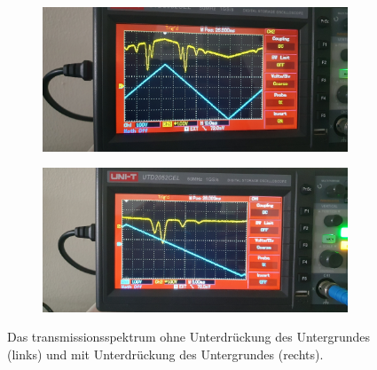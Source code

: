 \begin{figure}
    \centering
    \begin{subfigure}[b]{0.49\textwidth}
        \centering
        \includegraphics[width= \textwidth]{plots/Absorption_1.jpg}
    \end{subfigure}
    \hfill
    \begin{subfigure}[b]{0.49\textwidth}
        \centering
        \includegraphics[width= \textwidth]{plots/Absorption_2.jpg}
    \end{subfigure}
    \caption{Das transmissionsspektrum ohne Unterdrückung des Untergrundes (links) und mit Unterdrückung des Untergrundes (rechts).}
    \label{fig:3}
\end{figure}